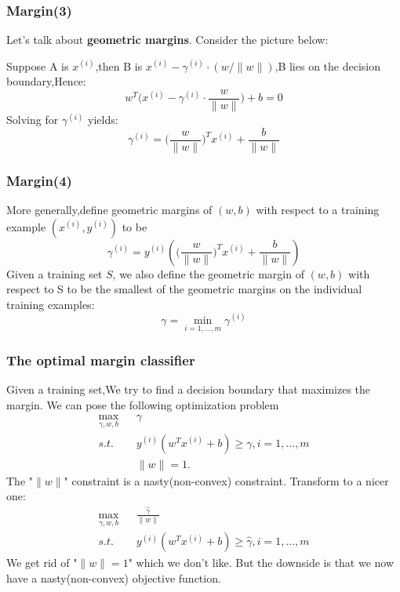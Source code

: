 \documentclass[slidestop,compress,mathserif]{beamer}
\begin{document}
    \begin{frame}[shrink]
        \frametitle{Margin(3)}
        Let’s talk about \textbf{geometric margins}. Consider the picture below:
        \begin{figure}
        \end{figure}
        Suppose A is $x^{(i)}$,then B is $x^{(i)}-\gamma^{(i)}\cdot (w/\|w\|)$,B lies on the decision boundary,Hence:
        $$w^T\bigg(x^{(i)}-\gamma^{(i)}\cdot\frac{w}{\|w\|}\bigg)+b=0$$
        Solving for $\gamma^{(i)}$ yields:
        $$\gamma^{(i)}=\bigg(\frac{w}{\|w\|}\bigg)^Tx^{(i)}+\frac{b}{\|w\|}$$
    \end{frame}

    \begin{frame}
        \frametitle{Margin(4)}
        More generally,define geometric margins of $(w,b)$ with respect to a training example $(x^{(i)},y^{(i)})$ to be
        $$\gamma^{(i)}=y^{(i)}\left(\bigg(\frac{w}{\|w\|}\bigg)^Tx^{(i)}+\frac{b}{\|w\|}\right)$$
        Given a training set $S$, we also define the geometric margin of $(w, b)$ with respect to S to be the smallest of the geometric margins on the individual training examples:
        $$\gamma=\min_{i=1,\ldots,m}\gamma^{(i)}$$
    \end{frame}

    \begin{frame}[shrink]
        \frametitle{The optimal margin classifier}
        Given a training set,We try to find a decision boundary that maximizes the margin. We can pose the following optimization problem
        \begin{eqnarray*}
            \max_{\gamma,w,b} && \gamma\\
            s.t. && y^{(i)}(w^Tx^{(i)}+b)\ge \gamma,i=1,\ldots,m\\
            && \|w\|=1.
        \end{eqnarray*}
        The "$\|w\|$" constraint is a nasty(non-convex) constraint.
        Transform to a nicer one:
        \begin{eqnarray*}
            \max_{\gamma,w,b} && \frac{\hat{\gamma}}{\|w\|}\\
            s.t. && y^{(i)}(w^Tx^{(i)}+b)\ge \hat{\gamma},i=1,\ldots,m
        \end{eqnarray*}
        We get rid of "$\|w\|=1$" which we don't like. But the downside is that we now have a nasty(non-convex) objective function.
        $$$$
    \end{frame}
\end{document}
